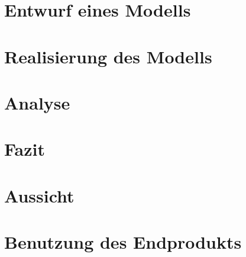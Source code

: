 
\clearpage
\section{Entwurf eines Modells}

\clearpage
\section{Realisierung des Modells}

\clearpage
\section{Analyse}

\clearpage
\section{Fazit}

\clearpage
\section{Aussicht}

\clearpage
\section{Benutzung des Endprodukts}


\nocite{GitHubGettingStartedHubot}
\nocite{BotkitBotkitToolkitbuilding}
\nocite{SlackConversationsAPI}
